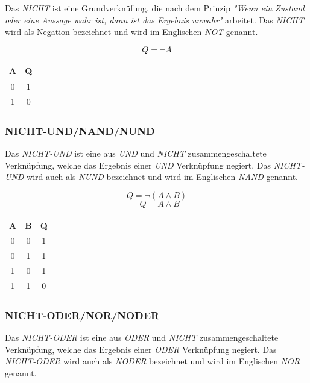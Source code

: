 \documentclass[a4paper, 12pt]{report}
\begin{document}
\begin{multicols}{2}
Das \emph{NICHT} ist eine Grundverknüfung, die nach dem Prinzip \emph{"Wenn ein
Zustand oder eine Aussage wahr ist, dann ist das Ergebnis unwahr"} arbeitet.
Das \emph{NICHT} wird als Negation bezeichnet und wird im Englischen \emph{NOT}
genannt.

\begin{center}
    \begin{equation}
	Q = \neg A
    \end{equation}
	\begin{tabular}{ | c || c | }
		\hline
		A & Q \\ \hline
		0 & 1 \\ \hline
		1 & 0 \\
		\hline
	\end{tabular}
\end{center}

\subsubsection{NICHT-UND/NAND/NUND}

Das \emph{NICHT-UND} ist eine aus \emph{UND} und \emph{NICHT}
zusammengeschaltete Verknüpfung, welche das Ergebnis einer \emph{UND}
Verknüpfung negiert. Das \emph{NICHT-UND} wird auch als \emph{NUND}
bezeichnet und wird im Englischen \emph{NAND} genannt.

\begin{center}
    \begin{equation}
	Q = \neg(A \land B)
    \end{equation}
    \begin{equation}
	\neg Q = A \land B
    \end{equation}
   \begin{tabular}{ | c | c || c | }
    	\hline
    	A & B & Q \\ \hline
    	0 & 0 & 1 \\ \hline
    	0 & 1 & 1 \\ \hline
    	1 & 0 & 1 \\ \hline
    	1 & 1 & 0 \\
    	\hline
    \end{tabular}
\end{center}

\subsubsection{NICHT-ODER/NOR/NODER}

Das \emph{NICHT-ODER} ist eine aus \emph{ODER} und \emph{NICHT}
zusammengeschaltete Verknüpfung, welche das Ergebnis einer \emph{ODER}
Verknüpfung negiert. Das \emph{NICHT-ODER} wird auch als \emph{NODER}
bezeichnet und wird im Englischen \emph{NOR} genannt.


\end{multicols}
\end{document}
